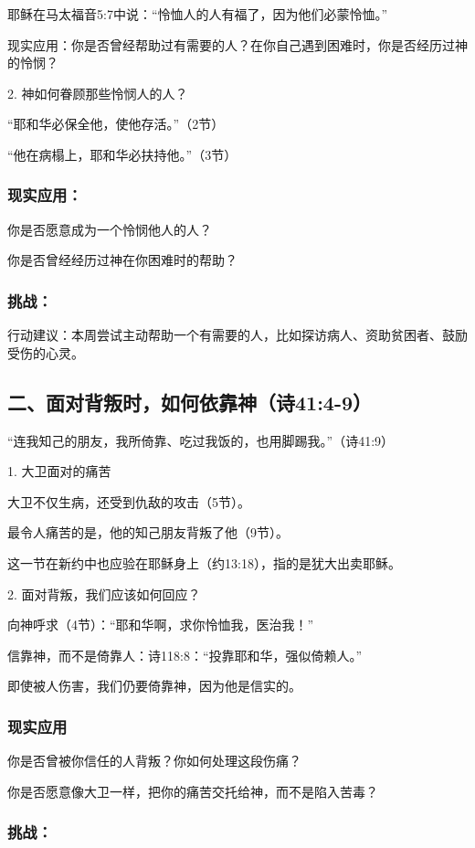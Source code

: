 \documentclass[a4paper, 12pt]{article}
\begin{document}
耶稣在马太福音5:7中说：“怜恤人的人有福了，因为他们必蒙怜恤。”

现实应用：你是否曾经帮助过有需要的人？在你自己遇到困难时，你是否经历过神的怜悯？

2. 神如何眷顾那些怜悯人的人？

“耶和华必保全他，使他存活。”（2节）

“他在病榻上，耶和华必扶持他。”（3节）

\subsubsection*{现实应用：}

\hspace{0.6cm}你是否愿意成为一个怜悯他人的人？

你是否曾经经历过神在你困难时的帮助？
\subsubsection*{挑战：}

行动建议：本周尝试主动帮助一个有需要的人，比如探访病人、资助贫困者、鼓励受伤的心灵。
\subsection*{二、面对背叛时，如何依靠神（诗41:4-9）}
“连我知己的朋友，我所倚靠、吃过我饭的，也用脚踢我。”（诗41:9）

1. 大卫面对的痛苦

大卫不仅生病，还受到仇敌的攻击（5节）。

最令人痛苦的是，他的知己朋友背叛了他（9节）。

这一节在新约中也应验在耶稣身上（约13:18），指的是犹大出卖耶稣。

2. 面对背叛，我们应该如何回应？

向神呼求（4节）：“耶和华啊，求你怜恤我，医治我！”

信靠神，而不是倚靠人：诗118:8：“投靠耶和华，强似倚赖人。”

即使被人伤害，我们仍要倚靠神，因为他是信实的。
\subsubsection*{现实应用}

\hspace{0.6cm}你是否曾被你信任的人背叛？你如何处理这段伤痛？

你是否愿意像大卫一样，把你的痛苦交托给神，而不是陷入苦毒？
\subsubsection*{挑战：}
\end{document}
